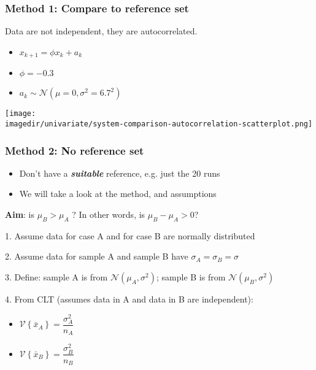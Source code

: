 \begin{frame}\frametitle{Method 1: Compare to reference set}

	Data are not independent, they are autocorrelated.
	\begin{itemize}
		\item $x_{k+1} = \phi x_{k} + a_k$
		\item $\phi = -0.3$
		\item $a_k \sim \mathcal{N}\left(\mu=0, \sigma^2=6.7^2\right)$
	\end{itemize}
	\begin{center}
		\texttt{[image: \\imagedir/univariate/system-comparison-autocorrelation-scatterplot.png]}
	\end{center}
\end{frame}

\begin{frame}\frametitle{Method 2: No reference set}
	\begin{itemize}
		\item Don't have a \textbf{\emph{suitable}} reference, e.g. just the 20 runs
		\item We will take a look at the method, and assumptions
	\end{itemize}

	\textbf{Aim}: is $\mu_B > \mu_A$ ? In other words, is $\mu_B - \mu_A > 0$?

	1. Assume data for case A and for case B are normally distributed

	2. Assume data for sample A and sample B have $\sigma_A = \sigma_B = \sigma$

	3. Define: sample A is from $\mathcal{N}\left(\mu_A, \sigma^2\right)$; sample B is from $\mathcal{N}\left(\mu_B, \sigma^2\right)$

	4. From CLT (assumes data in A and data in B are independent):
	\begin{itemize}
		\item $\mathcal{V}\left\{\bar{x}_A\right\} = \dfrac{\sigma^2_A}{n_A}$
		\item $\mathcal{V}\left\{\bar{x}_B\right\} = \dfrac{\sigma^2_B}{n_B}$
	\end{itemize}
\end{frame}

